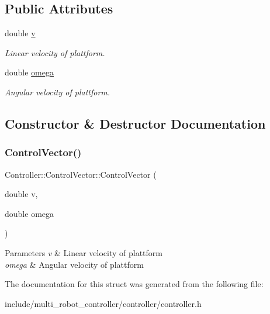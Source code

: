 \subsection*{Public Attributes}
\begin{DoxyCompactItemize}
\item 
\mbox{\label{structController_1_1ControlVector_af8d8ff93ddf343a13a35bba355d39976}} 
double \hyperlink{structController_1_1ControlVector_af8d8ff93ddf343a13a35bba355d39976}{v}
\begin{DoxyCompactList}\small\item\em Linear velocity of plattform. \end{DoxyCompactList}\item 
\mbox{\label{structController_1_1ControlVector_ad5963169c4ea0c021cb923191aef7ed3}} 
double \hyperlink{structController_1_1ControlVector_ad5963169c4ea0c021cb923191aef7ed3}{omega}
\begin{DoxyCompactList}\small\item\em Angular velocity of plattform. \end{DoxyCompactList}\end{DoxyCompactItemize}


\subsection{Constructor \& Destructor Documentation}
\mbox{\label{structController_1_1ControlVector_a547dd5c56a7be54acb7c44f7fdf52c57}} 
\subsubsection{\texorpdfstring{Control\+Vector()}{ControlVector()}}
{\footnotesize\ttfamily Controller\+::\+Control\+Vector\+::\+Control\+Vector (\begin{DoxyParamCaption}\item[{double}]{v,  }\item[{double}]{omega }\end{DoxyParamCaption})\hspace{0.3cm}{\ttfamily [inline]}}


\begin{DoxyParams}{Parameters}
{\em v} & Linear velocity of plattform \\
\hline
{\em omega} & Angular velocity of plattform \\
\hline
\end{DoxyParams}


The documentation for this struct was generated from the following file\+:\begin{DoxyCompactItemize}
\item 
include/multi\+\_\+robot\+\_\+controller/controller/controller.\+h\end{DoxyCompactItemize}
